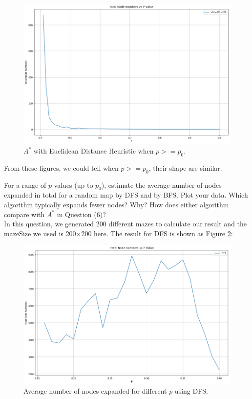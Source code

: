 \documentclass[letter]{article}
\begin{document}
\begin{questions}
	\begin{figure}
		\centering
		\includegraphics[width=\textwidth]{../pics/question6-6.png}
		\caption{\label{fig:6-6} $ A^* $ with Euclidean Distance Heuristic when $ p >= p_0 $.}
	\end{figure}
	
	From these figures, we could tell when $ p >= p_0 $, their shape are similar. \\
	
	\item {For a range of $ p $ values (up to $ p_0 $), estimate the average number of nodes expanded in total for a random map by DFS and by BFS. Plot your data. Which algorithm typically expands fewer nodes? Why? How does either algorithm compare with $ A^* $ in Question (6)?} \\
	
	In this question, we generated 200 different mazes to calculate our result and the mazeSize we used is 200×200 here.  The result for DFS is shown as Figure \ref{fig:7-1}: \\
	
	\begin{figure}
		\centering
		\includegraphics[width=\textwidth]{../pics/question7-1.png}
		\caption{\label{fig:7-1} Average number of nodes expanded for different $ p $ using DFS.}
	\end{figure}


\end{questions}
\end{document}
